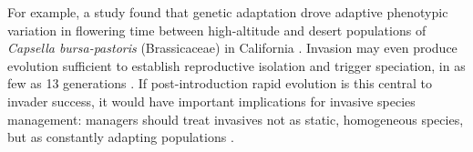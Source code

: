 \documentclass[12pt]{article}\usepackage[]{graphicx}\usepackage[]{color}
\begin{document}
    For example, a study found that genetic adaptation drove adaptive phenotypic variation in flowering time between high-altitude and desert populations of \textit{Capsella bursa-pastoris} (Brassicaceae) in California \parencite{Linde2001}. Invasion may even produce evolution sufficient to establish reproductive isolation and trigger speciation, in as few as 13 generations \parencite{Hendry2000}. If post-introduction rapid evolution is this central to invader success, it would have important implications for invasive species management: managers should treat invasives not as static, homogeneous species, but as constantly adapting populations \parencite{Lee2002invasion}.
	
\end{document}
